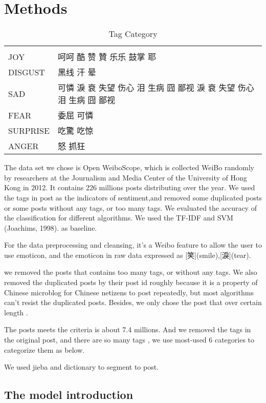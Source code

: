 \chapter{Methods}

\begin{table}[]
\centering
\caption{Tag Category}
\label{CategoryTable}
\begin{tabular}{ll}
      &  \\
JOY  & 呵呵 酷 赞 贊 乐乐 鼓掌 耶 \\
DISGUST & 黑线 汗 晕 \\
SAD &   可憐 淚 衰 失望 伤心 泪 生病 囧 鄙视  淚 衰 失望 伤心 泪 生病 囧 鄙视  \\
FEAR &  委屈  可憐 \\
SURPRISE &  吃驚 吃惊 \\
ANGER & 怒 抓狂
\end{tabular}
\end{table}

The data set we chose is Open WeiboScope, which is collected WeiBo randomly by researchers at the Journalism and Media Center of the University of Hong Kong in 2012. It contains 226 millions posts distributing over the year. We used the tags in post as the indicators of sentiment,and removed some duplicated posts or some posts without any tags, or too many tags. We evaluated the accuracy of the classification for different algorithms.  We used the TF-IDF and SVM (Joachims, 1998). as baseline.

For the data preprocessing and cleansing, it's a Weibo feature to allow the user to use emoticon, and the emoticon in raw data expressed as [笑](smile),[淚](tear).

we removed the posts that contains too many tags, or without any tags. We also removed the duplicated posts by their post id roughly because it is a property of Chinese microblog \cite{fu2013reality} for Chinese netizens to post repeatedly, but most algorithms can't resist the duplicated posts. Besides, we only chose the post that over certain length .

The posts meets the criteria is about 7.4 millions. And we removed the tags in the original post, and there are so many tags , we use most-used 6 categories to categorize them as below.

We used jieba and dictionary to segment to post.



\section{The model introduction}

